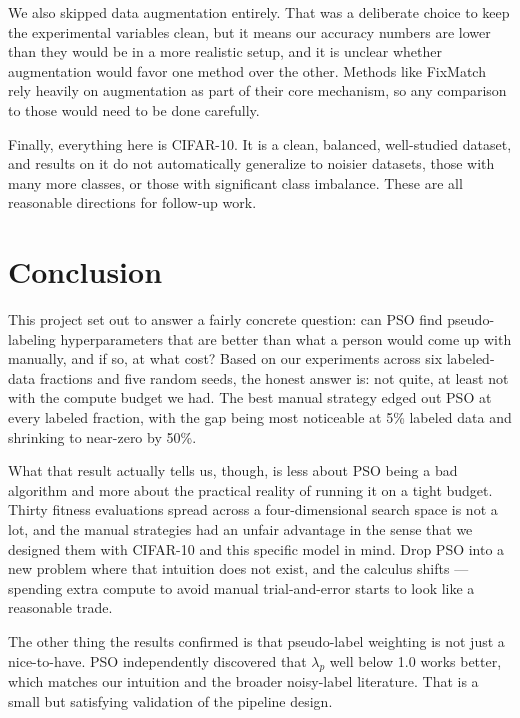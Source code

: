 \documentclass[journal]{IEEEtran}
\begin{document}
We also skipped data augmentation entirely. That was a deliberate choice to
keep the experimental variables clean, but it means our accuracy numbers are
lower than they would be in a more realistic setup, and it is unclear whether
augmentation would favor one method over the other. Methods like FixMatch
\cite{sohn2020fixmatch} rely heavily on augmentation as part of their core
mechanism, so any comparison to those would need to be done carefully.

Finally, everything here is CIFAR-10. It is a clean, balanced, well-studied
dataset, and results on it do not automatically generalize to noisier datasets,
those with many more classes, or those with significant class imbalance. These
are all reasonable directions for follow-up work.

\section{Conclusion}

This project set out to answer a fairly concrete question: can PSO find
pseudo-labeling hyperparameters that are better than what a person would come
up with manually, and if so, at what cost? Based on our experiments across
six labeled-data fractions and five random seeds, the honest answer is: not
quite, at least not with the compute budget we had. The best manual strategy
edged out PSO at every labeled fraction, with the gap being most noticeable
at 5\% labeled data and shrinking to near-zero by 50\%. 

What that result actually tells us, though, is less about PSO being a bad
algorithm and more about the practical reality of running it on a tight
budget. Thirty fitness evaluations spread across a four-dimensional search
space is not a lot, and the manual strategies had an unfair advantage in the
sense that we designed them with CIFAR-10 and this specific model in mind.
Drop PSO into a new problem where that intuition does not exist, and the
calculus shifts --- spending extra compute to avoid manual trial-and-error
starts to look like a reasonable trade.

The other thing the results confirmed is that pseudo-label weighting is not
just a nice-to-have. PSO independently discovered that $\lambda_p$ well below
1.0 works better, which matches our intuition and the broader noisy-label
literature. That is a small but satisfying validation of the pipeline design.
\end{document}
